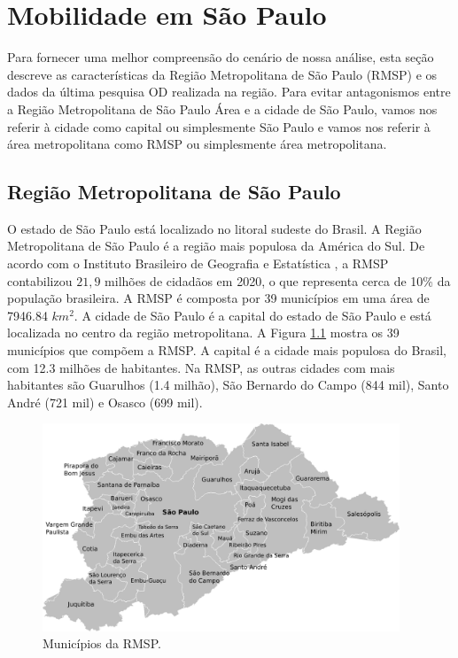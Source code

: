 \chapter{Mobilidade em São Paulo}
\label{cap:mobilidade-rmsp}

Para fornecer uma melhor compreensão do cenário de nossa análise, esta seção
descreve as características da Região Metropolitana de S\~ao Paulo (RMSP) e os dados da
última pesquisa OD realizada na região. Para evitar antagonismos entre a
Região Metropolitana de S\~ao Paulo Área e a cidade de S\~ao Paulo, vamos nos
referir à cidade como capital ou simplesmente S\~ao Paulo e vamos nos referir à
área metropolitana como RMSP ou simplesmente área metropolitana. 

\section{Região Metropolitana de São Paulo}

O estado de S\~ao Paulo está localizado no litoral sudeste do Brasil. A Regi\~ao
Metropolitana de S\~ao Paulo é a região mais populosa da América do Sul. De acordo
com o Instituto Brasileiro de Geografia e Estatística \citep{ibge2020}, a RMSP contabilizou $21,9$
milhões de cidadãos em 2020, o que representa cerca de 10\% da população
brasileira. A RMSP é composta por 39 municípios em uma área de \num{7946.84} $km^{2}$. A
cidade de São Paulo é a capital do estado de São Paulo e está localizada no
centro da região metropolitana. A Figura \ref{fig:map-spma} mostra os 39 municípios que compõem a
RMSP. A capital é a cidade mais populosa do Brasil, com 12.3 milhões de
habitantes. Na RMSP, as outras cidades com mais habitantes são Guarulhos (1.4
milhão), São Bernardo do Campo (844 mil), Santo André (721 mil) e Osasco (699
mil).

\begin{figure}[!htb]
  \centering
  \captionsetup{justification=centering}
  \includegraphics[width=0.95\textwidth]{../figuras/map-spma.png}
    \caption{Municípios da RMSP.\label{fig:map-spma}}
\end{figure}

